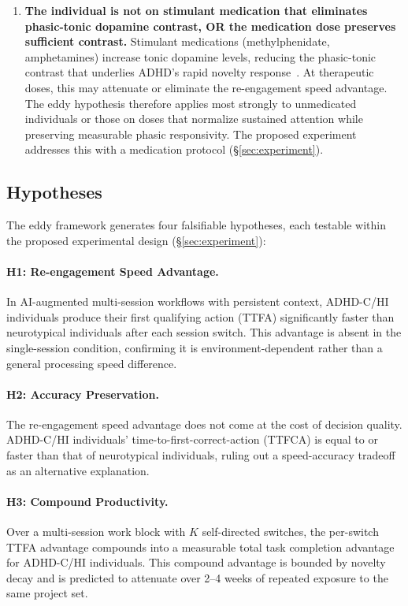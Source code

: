 \documentclass[sigconf,nonacm]{acmart}
\begin{document}
\begin{enumerate}
\item \textbf{The individual is not on stimulant medication that eliminates phasic-tonic dopamine contrast, OR the medication dose preserves sufficient contrast.} Stimulant medications (methylphenidate, amphetamines) increase tonic dopamine levels, reducing the phasic-tonic contrast that underlies ADHD's rapid novelty response~\cite{grace2001, cortese2025}. At therapeutic doses, this may attenuate or eliminate the re-engagement speed advantage. The eddy hypothesis therefore applies most strongly to unmedicated individuals or those on doses that normalize sustained attention while preserving measurable phasic responsivity. The proposed experiment addresses this with a medication protocol (\S\ref{sec:experiment}).
\end{enumerate}

\subsection{Hypotheses}

The eddy framework generates four falsifiable hypotheses, each testable within the proposed experimental design (\S\ref{sec:experiment}):

\paragraph{H1: Re-engagement Speed Advantage.} In AI-augmented multi-session workflows with persistent context, ADHD-C/HI individuals produce their first qualifying action (TTFA) significantly faster than neurotypical individuals after each session switch. This advantage is absent in the single-session condition, confirming it is environment-dependent rather than a general processing speed difference.

\paragraph{H2: Accuracy Preservation.} The re-engagement speed advantage does not come at the cost of decision quality. ADHD-C/HI individuals' time-to-first-correct-action (TTFCA) is equal to or faster than that of neurotypical individuals, ruling out a speed-accuracy tradeoff as an alternative explanation.

\paragraph{H3: Compound Productivity.} Over a multi-session work block with $K$ self-directed switches, the per-switch TTFA advantage compounds into a measurable total task completion advantage for ADHD-C/HI individuals. This compound advantage is bounded by novelty decay and is predicted to attenuate over 2--4 weeks of repeated exposure to the same project set.
\end{document}
